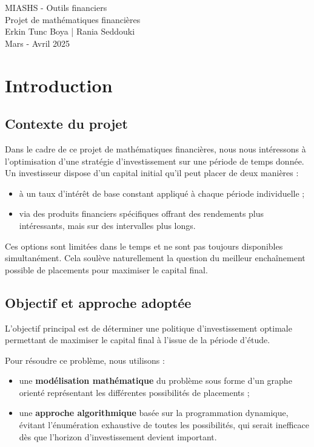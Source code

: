 \documentclass[a4paper,11pt]{article}
\begin{document}
    \begin{center}
        \Huge{MIASHS - Outils financiers}\\[0.5cm]
        \LARGE{Projet de mathématiques financières}\\[0.2cm]
        \Large{Erkin Tunc Boya | Rania Seddouki }\\
        \Large{Mars - Avril 2025}
    \end{center}

    \section{Introduction}

    \subsection{Contexte du projet}

    Dans le cadre de ce projet de mathématiques financières, nous nous intéressons à l’optimisation d’une stratégie d’investissement sur une période de temps donnée. Un investisseur dispose d’un capital initial qu’il peut placer de deux manières :
    \begin{itemize}
        \item à un taux d’intérêt de base constant appliqué à chaque période individuelle ;
        \item via des produits financiers spécifiques offrant des rendements plus intéressants, mais sur des intervalles plus longs.
    \end{itemize}

    Ces options sont limitées dans le temps et ne sont pas toujours disponibles simultanément. Cela soulève naturellement la question du meilleur enchaînement possible de placements pour maximiser le capital final.

    \subsection{Objectif et approche adoptée}

    L’objectif principal est de déterminer une politique d’investissement optimale permettant de maximiser le capital final à l’issue de la période d’étude.

    Pour résoudre ce problème, nous utilisons :
    \begin{itemize}
        \item une \textbf{modélisation mathématique} du problème sous forme d’un graphe orienté représentant les différentes possibilités de placements ;
        \item une \textbf{approche algorithmique} basée sur la programmation dynamique, évitant l’énumération exhaustive de toutes les possibilités, qui serait inefficace dès que l’horizon d’investissement devient important.
    \end{itemize}
\end{document}
